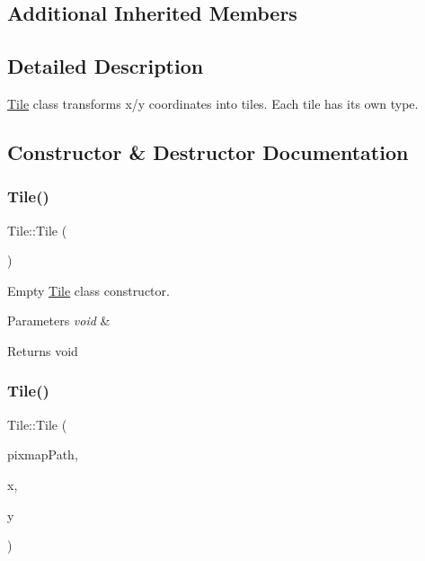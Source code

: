 \subsection*{Additional Inherited Members}


\subsection{Detailed Description}
\mbox{\hyperlink{class_tile}{Tile}} class transforms x/y coordinates into tiles. Each tile has its own type. 

\subsection{Constructor \& Destructor Documentation}
\mbox{\label{class_tile_aeeb5593bb6b75aae2edfcccbc84ab378}} 
\subsubsection{\texorpdfstring{Tile()}{Tile()}\hspace{0.1cm}{\footnotesize\ttfamily [1/2]}}
{\footnotesize\ttfamily Tile\+::\+Tile (\begin{DoxyParamCaption}{ }\end{DoxyParamCaption})}



Empty \mbox{\hyperlink{class_tile}{Tile}} class constructor. 


\begin{DoxyParams}{Parameters}
{\em void} & \\
\hline
\end{DoxyParams}
\begin{DoxyReturn}{Returns}
void 
\end{DoxyReturn}
\mbox{\label{class_tile_ab295fb34dca1d8e0b4bf8a3d37ddfbad}} 
\subsubsection{\texorpdfstring{Tile()}{Tile()}\hspace{0.1cm}{\footnotesize\ttfamily [2/2]}}
{\footnotesize\ttfamily Tile\+::\+Tile (\begin{DoxyParamCaption}\item[{Q\+String}]{pixmap\+Path,  }\item[{int}]{x,  }\item[{int}]{y }\end{DoxyParamCaption})}



